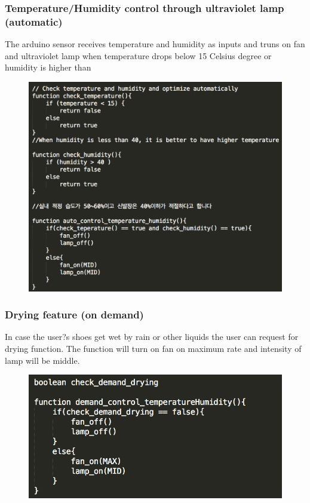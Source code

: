 \documentclass[conference]{IEEEtran}
\begin{document}
\subsubsection{Temperature/Humidity control through ultraviolet lamp (automatic)}
The arduino sensor receives temperature and humidity as inputs and truns on fan and ultraviolet lamp when temperature drops below 15 Celsius degree or humidity is higher than 
\begin{figure}[H]
\begin{center}
    \includegraphics[scale=0.48]{optimization1}
    \label{fig:label}
\end{center}
\end{figure}
\subsubsection{Drying feature (on demand)}
In case the user?s shoes get wet by rain or other liquids the user can request for drying function. The function will turn on fan on maximum rate and intensity of lamp will be middle.
\begin{figure}[H]
\begin{center}
    \includegraphics[scale=0.6]{optimization2}
    \label{fig:label}
\end{center}
\end{figure}
\end{document}
